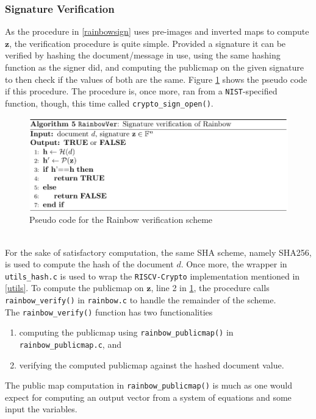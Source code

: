\subsubsection{Signature Verification}
As the procedure in \cref{rainbowsign} uses pre-images and inverted maps to compute $\textbf{z}$, the verification procedure is quite simple. Provided a signature it can be verified by hashing the document/message in use, using the same hashing function as the signer did, and computing the publicmap on the given signature to then check if the values of both are the same. Figure \ref{rainbowveri} shows the pseudo code if this procedure. The procedure is, once more, ran from a \texttt{NIST}-specified function, though, this time called \texttt{crypto\_sign\_open()}. 
\begin{figure}[h]
    \centering
    \includegraphics[width=\textwidth]{resources/rainbowver.png}
    \caption{Pseudo code for the Rainbow verification scheme}
    \label{rainbowveri}
\end{figure}\\
For the sake of satisfactory computation, the same SHA scheme, namely SHA256, is used to compute the hash of the document $d$. Once more, the wrapper in \texttt{utils\_hash.c} is used to wrap the \texttt{RISCV-Crypto} implementation mentioned in \cref{utils}. To compute the publicmap on $\textbf{z}$, line 2 in \cref{rainbowveri}, the procedure calls \texttt{rainbow\_verify()} in \texttt{rainbow.c} to handle the remainder of the scheme.\medskip\\
The \texttt{rainbow\_verify()} function has two functionalities
\begin{enumerate}
    \item computing the publicmap using \texttt{rainbow\_publicmap()} in\\ \texttt{rainbow\_publicmap.c}, and
    \item verifying the computed publicmap against the hashed document value.
\end{enumerate}
The public map computation in \texttt{rainbow\_publicmap()} is much as one would expect for computing an output vector from a system of equations and some input the variables.\medskip\\
